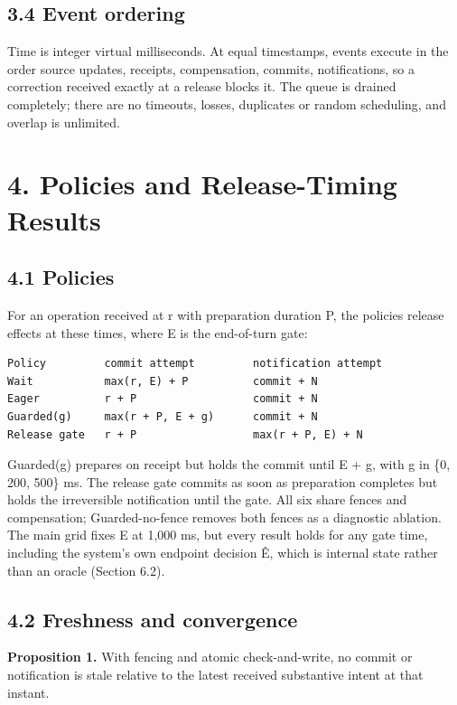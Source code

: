 \documentclass[review,12pt]{elsarticle}
\begin{document}
\subsection*{3.4 Event ordering}

Time is integer virtual milliseconds. At equal timestamps, events execute in the order source updates, receipts, compensation, commits, notifications, so a correction received exactly at a release blocks it. The queue is drained completely; there are no timeouts, losses, duplicates or random scheduling, and overlap is unlimited.


\section*{4. Policies and Release-Timing Results}

\subsection*{4.1 Policies}

For an operation received at r with preparation duration P, the policies release effects at these times, where E is the end-of-turn gate:


\begin{lstlisting}
Policy         commit attempt         notification attempt
Wait           max(r, E) + P          commit + N
Eager          r + P                  commit + N
Guarded(g)     max(r + P, E + g)      commit + N
Release gate   r + P                  max(r + P, E) + N
\end{lstlisting}

Guarded(g) prepares on receipt but holds the commit until E + g, with g in \{0, 200, 500\} ms. The release gate commits as soon as preparation completes but holds the irreversible notification until the gate. All six share fences and compensation; Guarded-no-fence removes both fences as a diagnostic ablation. The main grid fixes E at 1,000 ms, but every result holds for any gate time, including the system's own endpoint decision Ê, which is internal state rather than an oracle (Section 6.2).


\subsection*{4.2 Freshness and convergence}

\textbf{Proposition 1.} With fencing and atomic check-and-write, no commit or notification is stale relative to the latest received substantive intent at that instant.
\end{document}
